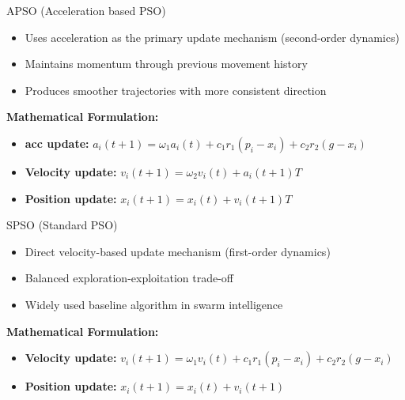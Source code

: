 \documentclass[aspectratio=169]{beamer}
\begin{document}
\begin{frame}{APSO (Acceleration based PSO)}
    \begin{itemize}
        \item Uses acceleration as the primary update mechanism (second-order dynamics)
        \item Maintains momentum through previous movement history
        \item Produces smoother trajectories with more consistent direction
    \end{itemize}
    
    \textbf{Mathematical Formulation:} \\
    \begin{itemize}
        \item \textbf{acc update:} $a_i(t+1) = \omega_{1} a
    _i(t) + c_1 r_1(p_i - x_i) + c_2r_2(g-x_i)$
        \item \textbf{Velocity update:} $v_i(t+1) = \omega_2v_i(t) + a_i(t+1)T$
        \item \textbf{Position update:} $x_i(t+1) = x_i(t) + v_i(t+1)T$
    \end{itemize}
\end{frame}

\begin{frame}{SPSO (Standard PSO)}
    \begin{itemize}
        \item Direct velocity-based update mechanism (first-order dynamics)
        \item Balanced exploration-exploitation trade-off
        \item Widely used baseline algorithm in swarm intelligence
    \end{itemize}
    
    \textbf{Mathematical Formulation:} \\
    \begin{itemize}
        \item \textbf{Velocity update:} $v_i(t+1) = \omega_{1} v
    _i(t) + c_1 r_1(p_i - x_i) + c_2r_2(g-x_i)$
        \item \textbf{Position update:} $x_i(t+1) = x_i(t) + v_i(t+1)$
    \end{itemize}
\end{frame}
\end{document}
